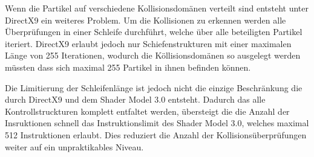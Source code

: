 \begin{Spacing}{\mylinespace}
		Wenn die Partikel auf verschiedene Kollisionsdomänen verteilt sind entsteht
		unter DirectX9 ein weiteres Problem. Um die Kollisionen zu erkennen
		werden alle Überprüfungen in einer Schleife durchführt, welche über alle
		beteiligten Partikel iteriert. DirectX9 erlaubt jedoch nur Schiefenstrukturen
		mit einer maximalen Länge von 255 Iterationen, wodurch die
		Köllisionsdomänen so ausgelegt werden müssten dass sich maximal
		255 Partikel in ihnen befinden können.
		
		Die Limitierung der Schleifenlänge ist jedoch nicht die einzige
		Beschränkung die durch DirectX9 und dem Shader Model 3.0 entsteht.
		Dadurch das alle Kontrollstruckturen komplett entfaltet werden, übersteigt die
		die Anzahl der Insruktionen schnell das Instruktionslimit des
		Shader Model 3.0, welches maximal 512 Instruktionen erlaubt.
		Dies reduziert die Anzahl der Kollisionsüberprüfungen
		weiter auf ein unpraktikables Niveau. 
		
		

\end{Spacing}
